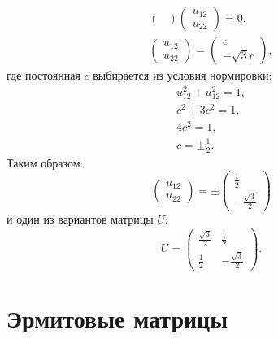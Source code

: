 \begin{example}
\begin{gather*}
\begin{pmatrix}
        \end{pmatrix}
        \begin{pmatrix}
            u_{12} \\
            u_{22}
        \end{pmatrix}
        = 0 , \\
        \begin{pmatrix}
            u_{12} \\
            u_{22}
        \end{pmatrix}
        = \begin{pmatrix}
              c \\
              - \sqrt{3}  c
        \end{pmatrix} ,
    \end{gather*}
    где постоянная $c$ выбирается из условия нормировки:
    \begin{gather*}
        u_{12}^2 + u_{12}^2 = 1 , \\
        c^2 + 3 c^2 = 1 , \\
        4 c^2 = 1 , \\
        c = \pm \frac{1}{2} .
    \end{gather*}
    Таким образом:
    \[
        \begin{pmatrix}
            u_{12} \\
            u_{22}
        \end{pmatrix}
        = \pm \begin{pmatrix}
                  \frac{1}{2} \\
                  - \frac{\sqrt{3}}{2}
        \end{pmatrix}
    \]
    и один из вариантов матрицы $U$:
    \[
        U
        = \begin{pmatrix}
              \frac{\sqrt{3}}{2} & \frac{1}{2}          \\
              \frac{1}{2}        & - \frac{\sqrt{3}}{2}
        \end{pmatrix} .
    \]
\end{example}


\section{Эрмитовые матрицы}

